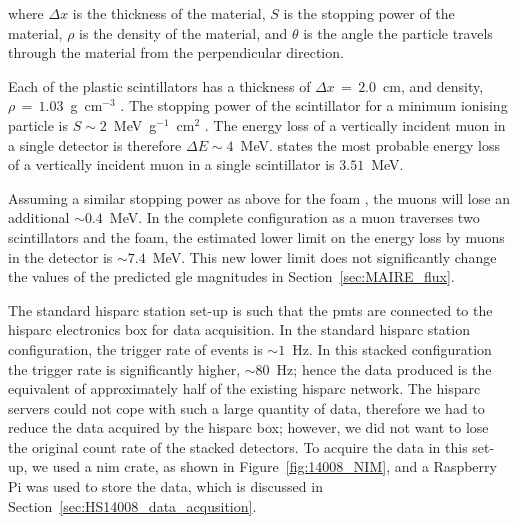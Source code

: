 where $\Delta x$ is the thickness of the material, $S$ is the stopping power of the material, $\rho$ is the density of the material, and $\theta$ is the angle the particle travels through the material from the perpendicular direction.

Each of the plastic scintillators has a thickness of $\Delta x \, = \, 2.0$~cm, and density, $\rho \, = \, 1.03$~g~cm$^{-3}$ \citep{montanus_observability_2017}. The stopping power of the scintillator for a minimum ionising particle is $S \sim 2$~MeV~g$^{-1}$~cm$^{2}$ \citep{fokkema_hisparc_2012, montanus_observability_2017}. The energy loss of a vertically incident muon in a single detector is therefore $\Delta E \sim 4$~MeV. \cite{van_dam_hisparc_2020} states the most probable energy loss of a vertically incident muon in a single scintillator is $3.51$~MeV.

Assuming a similar stopping power as above for the foam \citep{groom_muon_2001, montanus_observability_2017}, the muons will lose an additional $\sim 0.4$~MeV. In the complete configuration as a muon traverses two scintillators and the foam, the estimated lower limit on the energy loss by muons in the detector is $\sim 7.4$~MeV. This new lower limit does not significantly change the values of the predicted \gls{gle} magnitudes in Section~\ref{sec:MAIRE_flux}.

The standard \gls{hisparc} station set-up is such that the \glspl{pmt} are connected to the \gls{hisparc} electronics box for data acquisition. In the standard \gls{hisparc} station configuration, the trigger rate of events is $\sim 1$~Hz. In this stacked configuration the trigger rate is significantly higher, $\sim 80$~Hz; hence the data produced is the equivalent of approximately half of the existing \gls{hisparc} network. The \gls{hisparc} servers could not cope with such a large quantity of data, therefore we had to reduce the data acquired by the \gls{hisparc} box; however, we did not want to lose the original count rate of the stacked detectors. To acquire the data in this set-up, we used a \gls{nim} crate, as shown in Figure~\ref{fig:14008_NIM}, and a Raspberry Pi was used to store the data, which is discussed in Section~\ref{sec:HS14008_data_acqusition}.

